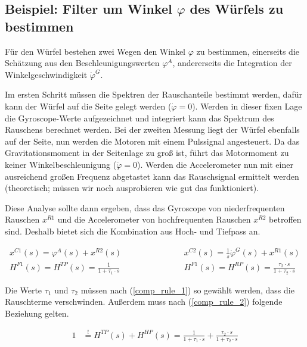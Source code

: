 \documentclass{article}
\begin{document}
\subsection{Beispiel: Filter um Winkel $\varphi$ des Würfels zu bestimmen}
Für den Würfel bestehen zwei Wegen den Winkel $\varphi$ zu bestimmen, einerseits die Schätzung aus den Beschleunigungswerten $\varphi^A$, andererseits die Integration der Winkelgeschwindigkeit $\dot{\varphi}^G$.

Im ersten Schritt müssen die Spektren der Rauschanteile bestimmt werden, dafür kann der Würfel auf die Seite gelegt werden ($\dot{\varphi} = 0$). Werden in dieser fixen Lage die Gyroscope-Werte aufgezeichnet und integriert kann das Spektrum des Rauschens berechnet werden. 
Bei der zweiten Messung liegt der Würfel ebenfalls auf der Seite, nun werden die Motoren mit einem Pulssignal angesteuert. Da das Gravitationsmoment in der Seitenlage zu groß ist, führt das Motormoment zu keiner Winkelbeschleunigung ($\ddot{\varphi}=0$). Werden die Accelerometer nun mit einer ausreichend großen Frequenz abgetastet kann das Rauschsignal ermittelt werden (theoretisch; müssen wir noch ausprobieren wie gut das funktioniert).

Diese Analyse sollte dann ergeben, dass das Gyroscope von niederfrequenten Rauschen $x^{R1}$ und die Accelerometer von hochfrequenten Rauschen $x^{R2}$ betroffen sind. Deshalb bietet sich die Kombination aus Hoch- und Tiefpass an.

\begin{equation}
\begin{split}
x^{C1}(s) = \varphi^A(s) + x^{R2}(s) \hspace{80pt} & x^{C2}(s) = \frac{1}{s} \dot{\varphi}^G(s) + x^{R1}(s)  \\
H^{F1}(s) = H^{TP}(s) = \frac{1}{1 + \tau_1 \cdot s} \hspace{80pt} & H^{F1}(s)=H^{RP}(s) = \frac{\tau_2 \cdot s}{1 + \tau_2 \cdot s}
\end{split}
\end{equation}

Die Werte $\tau_1$ und $\tau_2$ müssen nach (\ref{comp_rule_1}) so gewählt werden, dass die Rauschterme verschwinden. Außerdem muss nach (\ref{comp_rule_2}) folgende Beziehung gelten.

\begin{equation}
\begin{split}
1 & \overset{!}{=}  H^{TP}(s) + H^{HP}(s) = \frac{1}{1 + \tau_1 \cdot s} + \frac{\tau_2 \cdot s}{1 + \tau_2 \cdot s}
\end{split}
\end{equation}
\end{document}
